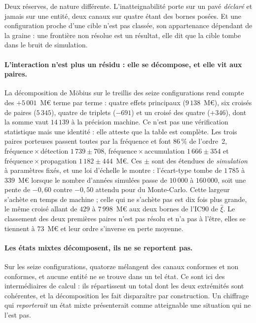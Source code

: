 \noindent Deux réserves, de nature différente. L'inatteignabilité porte sur un pavé \emph{déclaré}
et jamais sur une entité, deux canaux sur quatre étant des bornes posées. Et une configuration
proche d'une cible n'est pas classée, son appartenance dépendant de la graine : une frontière non
résolue est un résultat, elle dit que la cible tombe dans le bruit de simulation.

\paragraph{L'interaction n'est plus un résidu : elle se décompose, et elle vit aux paires.} La
décomposition de Möbius sur le treillis des seize configurations rend compte des $+5\,001$~M\euro{}
terme par terme : quatre effets principaux ($9\,138$~M\euro), six croisés de paires ($5\,345$),
quatre de triplets ($-691$) et un croisé des quatre ($+346$), dont la somme vaut $14\,139$ à la
précision machine. Ce n'est pas une vérification statistique mais une identité : elle atteste que
la table est complète. Les trois paires porteuses passent toutes par la fréquence et font
$86\,\%$ de l'ordre~2, fréquence\,$\times$\,détection $1\,739\pm708$,
fréquence\,$\times$\,accumulation $1\,666\pm354$ et fréquence\,$\times$\,propagation
$1\,182\pm444$~M\euro. Ces $\pm$ sont des étendues de \emph{simulation} à paramètres fixés, et une
loi d'échelle le montre : l'écart-type tombe de $1\,785$ à $339$~M\euro{} lorsque le nombre
d'années simulées passe de $10\,000$ à $160\,000$, soit une pente de $-0{,}60$ contre $-0{,}50$
attendu pour du Monte-Carlo. Cette largeur s'achète en temps de machine ; celle qui ne s'achète pas
est dix fois plus grande, le même croisé allant de $429$ à $7\,998$~M\euro{} aux deux bornes de
l'IC90 de $\hat\xi$. Le classement des deux premières paires n'est pas résolu et n'a pas à
l'être, elles se tiennent à $73$~M\euro{} et leur ordre s'inverse en perte moyenne.

\paragraph{Les états mixtes décomposent, ils ne se reportent pas.} Sur les seize configurations,
quatorze mélangent des canaux conformes et non conformes, et aucune entité ne se trouve dans un tel
état. Ce sont ici des intermédiaires de calcul : ils répartissent un total dont les deux extrémités
sont cohérentes, et la décomposition les fait disparaître par construction. Un chiffrage qui
\emph{reporterait} un état mixte présenterait comme atteignable une situation qui ne l'est pas.


